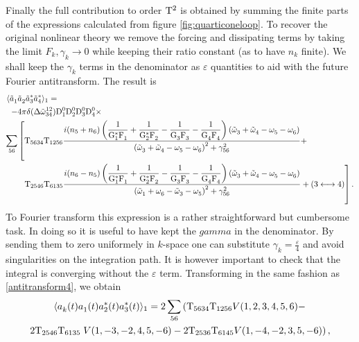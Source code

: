Finally the full contribution to order $\mathrm{T}^2$ is obtained by summing the finite parts of the expressions calculated from figure \ref{fig:quarticoneloop}.
To recover the original nonlinear theory we remove the forcing and dissipating terms by taking the limit $F_k, \gamma_k \rightarrow 0$ while keeping their ratio constant
(as to have $n_k$ finite). We shall keep the $\gamma_k$ terms in the denominator as $\varepsilon$ quantities to aid with the future Fourier antitransform. The result is 
\begin{equation}
    \begin{aligned}
    \langle\tilde{a}_1^{} &\tilde{a}_2^{}\tilde{a}_3^{*}\tilde{a}_4^{*} \rangle_1 = 
    \\
    -&4\pi \delta(\Delta{\tilde{\omega}}^{12}_{34})\mathrm{D}^0_1\mathrm{D}^0_2\mathrm{D}^0_3\mathrm{D}^0_4 \times
    \\
      \sum_{56}&\left[\mathrm{T}_{5634}\mathrm{T}_{1256}
    \frac{i(n_5 + n_6)\left(\dfrac{1}{\mathrm{G}_1^*\mathrm{F}_1^{}}+\dfrac{1}{\mathrm{G}_2^*\mathrm{F}_2^{}}-\dfrac{1}{\mathrm{G}_3^{}\mathrm{F}_3^{}}
    -\dfrac{1}{\mathrm{G}_4^{}\mathrm{F}_4^{}}\right)\left( \tilde{\omega}^{}_3 + \tilde{\omega}^{}_4 - \omega^{}_5 - \omega^{}_6\right)}{\left( \tilde{\omega}^{}_3 + \tilde{\omega}^{}_4 - \omega^{}_5 - \omega^{}_6\right)^2 + \gamma^2_{56}}
    +  \right.
    \\
    &\hspace{2mm}\left. \mathrm{T}_{2546}\mathrm{T}_{6135}
    \frac{i(n_6 - n_5)\left(\dfrac{1}{\mathrm{G}_1^*\mathrm{F}_1^{}}+\dfrac{1}{\mathrm{G}_2^*\mathrm{F}_2^{}}-\dfrac{1}{\mathrm{G}_3^{}\mathrm{F}_3^{}}
    -\dfrac{1}{\mathrm{G}_4^{}\mathrm{F}_4^{}}\right)\left( \tilde{\omega}^{}_3 + \tilde{\omega}^{}_4 - \omega^{}_5 - \omega^{}_6\right)}{\left( \tilde{\omega}^{}_1 + \omega^{}_6 - \tilde{\omega}^{}_3 - \omega^{}_5\right)^2 + \gamma^2_{56}}
    + \left( 3 \longleftrightarrow 4 \right) \right].
    \end{aligned}
    \label{transformedfourpoint}
\end{equation}
To Fourier transform this expression is a rather straightforward but cumbersome task. In doing so it is useful to have kept the $gamma$ in the denominator. 
By sending them to zero uniformely in $k$-space one can substitute $\gamma_k= \frac{\varepsilon}{4}$ and avoid singularities on the integration path. It is however important 
to check that the integral is converging without the $\varepsilon$ term. Transforming in the same fashion as \eqref{antitransform4}, we obtain 
\begin{multline}
    \langle a_k^{}(t) a_1^{}(t) a_2^{*}(t)a_3^{*}(t) \rangle_{1} = 2\sum_{56} \left( \mathrm{T}_{5634}\mathrm{T}_{1256}  V(1,2,3,4,5,6) - \right.\\
    2\mathrm{T}_{2546}\mathrm{T}_{6135}
    \left.V(1,-3,-2,4,5,-6) - 2\mathrm{T}_{2536}\mathrm{T}_{6145} V(1,-4,-2,3,5,-6)  \right),
\end{multline}
